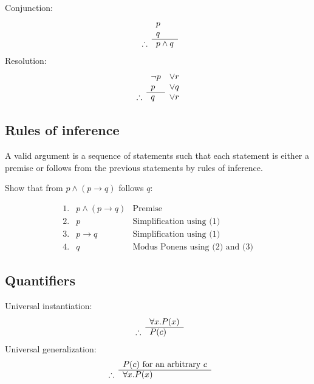 Conjunction:
\begin{equation}
    \begin{array}{r l}
                   & p         \\
                   & q         \\
        \cline{2-2}
        \therefore & p \land q
    \end{array}
\end{equation}
Resolution:
\begin{equation}
    \begin{array}{r ll}
                   & \neg  p & \lor r \\
                   & p       & \lor q \\
        \cline{2-2}
        \therefore & q       & \lor r
    \end{array}
\end{equation}

\subsection{Rules of inference}
A valid argument is a sequence of statements such that each statement is either a premise or follows from the previous statements by rules of inference.

\begin{example}
    Show that from \(p \land (p \rightarrow q)\) follows \(q\):

    \begin{equation*}
        \begin{array}{rll}
            \text{1.} & p \land (p \rightarrow q) & \text{Premise}                        \\
            \text{2.} & p                         & \text{Simplification using (1)}       \\
            \text{3.} & p \rightarrow q           & \text{Simplification using (1)}       \\
            \text{4.} & q                         & \text{Modus Ponens using (2) and (3)}
        \end{array}
    \end{equation*}

\end{example}

\subsection{Quantifiers}
Universal instantiation:
\begin{equation}
    \begin{array}{r l}
                   & \forall x. P(x) \\
        \cline{2-2}
        \therefore & P(c)
    \end{array}
\end{equation}
Universal generalization:
\begin{equation}
    \begin{array}{r l}
                   & P(c) \text{ for an arbitrary } c \\
        \cline{2-2}
        \therefore & \forall x. P(x)
    \end{array}
\end{equation}

